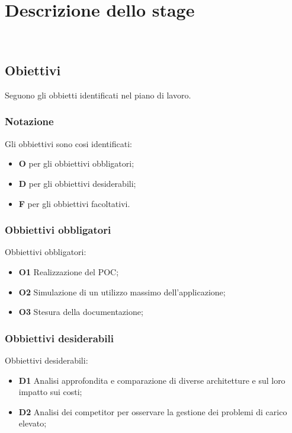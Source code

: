 \chapter{Descrizione dello stage}
\\
\label{cap:descrizione-stage}
\section{Obiettivi}
\label{sec:obiettivi}
Seguono gli obbietti identificati nel piano di lavoro.

\subsection{Notazione}
\label{subsec:notazione}
Gli obbiettivi sono cosi identificati:

\begin{itemize}
    \item \textbf{O} per gli obbiettivi obbligatori;
    \item \textbf{D} per gli obbiettivi desiderabili;
    \item \textbf{F} per gli obbiettivi facoltativi.
\end{itemize}

\subsection{Obbiettivi obbligatori}
Obbiettivi obbligatori:

\begin{itemize}
    \item \textbf{O1} Realizzazione del POC;
    \item \textbf{O2} Simulazione di un utilizzo massimo dell'applicazione;
    \item \textbf{O3} Stesura della documentazione;

\end{itemize}
\subsection{Obbiettivi desiderabili}
Obbiettivi desiderabili:
\begin{itemize}
    \item \textbf{D1} Analisi approfondita e comparazione di diverse architetture e sul loro impatto sui costi;
    \item \textbf{D2} Analisi dei competitor per osservare la gestione dei problemi di carico elevato;

\end{itemize}

